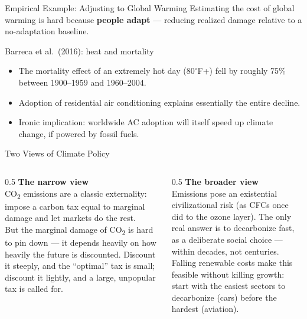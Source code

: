 \documentclass[11pt,aspectratio=169]{beamer}
\begin{document}
\begin{frame}{Empirical Example: Adjusting to Global Warming}
  Estimating the cost of global warming is hard because \textbf{people adapt} --- reducing realized damage relative to a no-adaptation baseline.
  \begin{block}{Barreca et al.\ (2016): heat and mortality}
    \begin{itemize}
      \item The mortality effect of an extremely hot day ($80^\circ$F+) fell by roughly 75\% between 1900--1959 and 1960--2004.
      \item Adoption of residential air conditioning explains essentially the entire decline.
      \item Ironic implication: worldwide AC adoption will itself speed up climate change, if powered by fossil fuels.
    \end{itemize}
  \end{block}
\end{frame}

\begin{frame}{Two Views of Climate Policy}
  \begin{columns}[T]
    \begin{column}{0.5\textwidth}
      \textbf{The narrow view}\\
      \small CO\textsubscript{2} emissions are a classic externality: impose a carbon tax equal to marginal damage and let markets do the rest.\\[0.4em]
      But the marginal damage of CO\textsubscript{2} is hard to pin down --- it depends heavily on how heavily the future is discounted. Discount it steeply, and the ``optimal'' tax is small; discount it lightly, and a large, unpopular tax is called for.
    \end{column}
    \begin{column}{0.5\textwidth}
      \textbf{The broader view}\\
      \small Emissions pose an existential civilizational risk (as CFCs once did to the ozone layer). The only real answer is to decarbonize fast, as a deliberate social choice --- within decades, not centuries.\\[0.4em]
      Falling renewable costs make this feasible without killing growth: start with the easiest sectors to decarbonize (cars) before the hardest (aviation).
    \end{column}
  \end{columns}
\end{frame}
\end{document}
